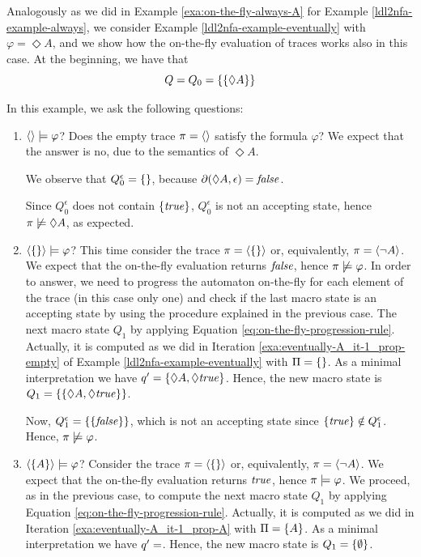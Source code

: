 \begin{example}\label{exa:on-the-fly-eventually-A}
	Analogously as we did in Example \ref{exa:on-the-fly-always-A} for Example \ref{ldl2nfa-example-always}, we consider Example \ref{ldl2nfa-example-eventually} with $\varphi = \Diamond A$, and we show how the on-the-fly evaluation of traces works also in this case.
	At the beginning, we have that $$Q = Q_0 = \{\{\Diamond A\}\}$$
	
	In this example, we ask the following questions:
	\begin{enumerate}
		\item $\langle  \rangle \models \varphi$? Does the empty trace $\pi = \langle  \rangle$ satisfy the formula $\varphi$? We expect that the answer is no, due to the semantics of $\Diamond A$. 
		
		We observe that $Q_0^\epsilon = \{\}$,
		because $\partial\lparen \Diamond A, \epsilon\rparen = \mathit{false}$.
		
		Since $Q_0^\epsilon$ does not contain $\{\mathit{true}\}$, $Q_0^\epsilon$ is not an accepting state, hence $\pi \not\models \Diamond A$, as expected.
		
		\item $\langle \{\} \rangle \models \varphi$? This time consider the trace $\pi = \langle \{\} \rangle$ or, equivalently, $\pi = \langle \lnot A \rangle$. We expect that the on-the-fly evaluation returns $\mathit{false}$, hence $\pi \not \models \varphi$. In order to answer, we need to progress the automaton on-the-fly for each element of the trace (in this case only one) and check if the last macro state is an accepting state by using the procedure explained in the previous case.
		The next macro state $Q_1$ by applying Equation \ref{eq:on-the-fly-progression-rule}. Actually, it is computed as we did in Iteration \ref{exa:eventually-A_it-1_prop-empty} of Example \ref{ldl2nfa-example-eventually} with $\Pi = \{\}$. 
		 As a minimal interpretation we have $q' = \{\Diamond A, \Diamond \mathit{true}\}$. Hence, the new macro state is $Q_1 = \{\{\Diamond A, \Diamond \mathit{true}\}\}$.
		 
		Now, $Q_1^\epsilon = \{\{\mathit{false}\}\}$, which is not an accepting state since $\{\mathit{true}\} \notin Q_1^\epsilon$. Hence, $\pi \not \models \varphi$.\label{exa:on-the-fly-eventually-A-trace-empty}
		
		\item $\langle \{A\} \rangle \models \varphi$? Consider the trace $\pi = \langle \{\} \rangle$ or, equivalently, $\pi = \langle \lnot A \rangle$. We expect that the on-the-fly evaluation returns $\mathit{true}$, hence $\pi \models \varphi$. We proceed, as in the previous case, to compute the next macro state $Q_1$ by applying Equation \ref{eq:on-the-fly-progression-rule}. Actually, it is computed as we did in Iteration \ref{exa:eventually-A_it-1_prop-A} with $\Pi = \{A\}$. As a minimal interpretation we have $q' = \empty$. Hence, the new macro state is $Q_1 = \{\emptyset\}$.
		

\end{enumerate}
\end{example}
